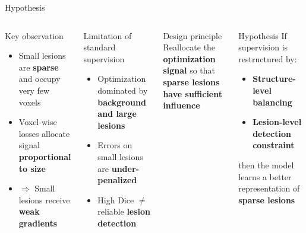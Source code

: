 \documentclass[10pt,aspectratio=169]{beamer}
\begin{document}
\begin{frame}{Hypothesis}

\begin{columns}[T,totalwidth=\textwidth]


\begin{block}{Key observation}
\small
\begin{itemize}
  \item Small lesions are \textbf{sparse} and occupy very few voxels
  \item Voxel-wise losses allocate signal \textbf{proportional to size}
  \item $\Rightarrow$ Small lesions receive \textbf{weak gradients}
\end{itemize}
\end{block}

\vspace{0.2cm}

\begin{block}{Limitation of standard supervision}
\small
\begin{itemize}
  \item Optimization dominated by \textbf{background and large lesions}
  \item Errors on small lesions are \textbf{under-penalized}
  \item High Dice $\neq$ reliable \textbf{lesion detection}
\end{itemize}
\end{block}

\vspace{0.2cm}

\begin{block}{Design principle}
\small
\centering
Reallocate the \textbf{optimization signal} so that \\
\textbf{sparse lesions have sufficient influence}
\end{block}


\begin{block}{Hypothesis}
\small
If supervision is restructured by:
\begin{itemize}
  \item \textbf{Structure-level balancing}
  \item \textbf{Lesion-level detection constraint}
\end{itemize}
then the model learns a better representation of \textbf{sparse lesions}
\end{block}


\end{columns}
\end{frame}
\end{document}

